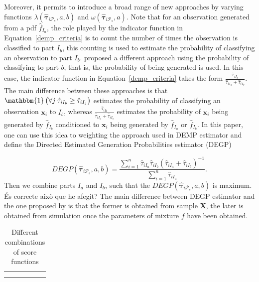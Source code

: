 \documentclass[10pt, a4paper]{article}
\newcommand{\m}[1]{\boldsymbol{#1}}
\begin{document}
\begin{spacing}{1.9}
Moreover, it permits to introduce a broad range of new approaches by varying functions $\lambda(\hat{\m \tau}_{i \mathcal{P}_s}, a, b)$ and $\omega(\hat{\m \tau}_{i \mathcal{P}_s}, a)$. Note that for an observation generated from a pdf $\hat{f}_{I_a}$, the role played by the indicator function in Equation~\ref{demp_criteria} is to count the number of times the observation is classified to part $I_b$, this counting is used to estimate the probability of classifying an observation to part $I_b$. \cite{longford2014} proposed a different approach using the probability of classifying to part $b$, that is, the probability of being generated is used. In this case, the indicator function in Equation~\ref{demp_criteria} takes the form $\frac{\hat{\tau}_{iI_b}}{\hat{\tau}_{iI_a} + \hat{\tau}_{iI_b}}$. The main difference between these approaches is that $\mathbbm{1}\left( \forall j\; \hat{\tau}_{i I_{b}} \geq \hat{\tau}_{iI_j} \right)$ estimates the probability of classifying an observation $\m x_i$ to $I_b$, whereas $\frac{\hat{\tau}_{iI_b}}{\hat{\tau}_{iI_a} + \hat{\tau}_{iI_b}}$ estimates the probability of $\m x_i$ being generated by $\hat{f}_{I_b}$ conditioned to $\m x_i$  being generated by $\hat{f}_{I_a}$ or $\hat{f}_{I_b}$. In this paper, one can use this idea to weighting the approach used in DEMP estimator and define the Directed Estimated Generation Probabilities estimator (DEGP)

\begin{equation}\label{demp2_criteria}
DEGP(\hat{\m \tau}_{i \mathcal{P}_s}, a, b) =\frac{ \sum_{i=1}^n \hat{\tau}_{iI_a} \hat{\tau}_{iI_b}(\hat{\tau}_{iI_a} + \hat{\tau}_{iI_b})^{-1}  }{\sum_{i=1}^n \hat{\tau}_{iI_a} }.
\end{equation}
Then we combine parts $I_a$ and $I_b$, such that the $DEGP(\hat{\m \tau}_{i \mathcal{P}_s}, a, b)$ is maximum. {\color{blue} \'{E}s correcte aix\`{o} que he afegit?} The main difference between DEGP estimator and the one proposed by \cite{longford2014} is that the former is obtained from sample $\m X$, the later is obtained from simulation once the parameters of mixture $f$ have been obtained.

\begin{table}[htpb]
\caption{Different combinations of score functions}
\begin{tabular}{c  c | >{\centering}m{0.7in} | >{\centering}m{0.8in} | >{\centering}m{0.7in} | m{0in}}
 & \multicolumn{1}{c}{} & \multicolumn{1}{c}{} & \multicolumn{1}{c}{} & \multicolumn{1}{c}{} & \multicolumn{1}{c}{}\\
 & \multicolumn{1}{c}{} & \multicolumn{3}{c}{$\omega(\boldsymbol\tau_i, a)$} &\\


\end{tabular}
\end{table}
\end{spacing}
\end{document}
